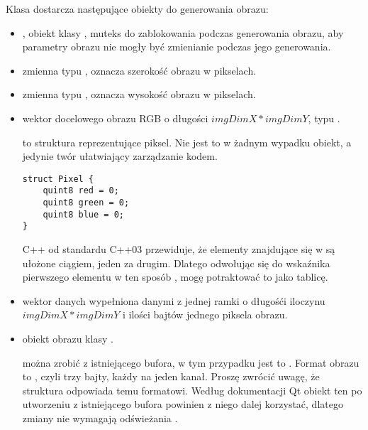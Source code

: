 \label{sec:algorithm-pixmap-generate}

Klasa  dostarcza następujące obiekty do generowania obrazu:
\begin{itemize}
    \item {}, obiekt klasy , muteks do zablokowania podczas generowania obrazu, aby parametry obrazu nie mogły być zmienianie podczas jego generowania.

    \item {} zmienna typu , oznacza szerokość obrazu w pikselach.

    \item {} zmienna typu , oznacza wysokość obrazu w pikselach.

    \item {} wektor docelowego obrazu RGB o długości $imgDimX*imgDimY$, typu .

           to struktura reprezentujące piksel.
          Nie jest to w żadnym wypadku obiekt, a jedynie twór ułatwiający zarządzanie kodem.

          \begin{lstlisting}
struct Pixel {
    quint8 red = 0;   
    quint8 green = 0;    
    quint8 blue = 0;   
}\end{lstlisting}

        \par
        C++ od standardu C++03 przewiduje, że elementy znajdujące się w  są ułożone ciągiem, jeden za drugim.
        Dlatego odwołując się do wskaźnika pierwszego elementu w ten sposób , mogę potraktować to jako tablicę.

    \item {} wektor danych wypełniona danymi z jednej ramki o długośći iloczynu $imgDimX*imgDimY$ i ilości bajtów jednego piksela obrazu.

    \item {} obiekt obrazu klasy .

           można zrobić z istniejącego bufora, w tym przypadku jest to .
          Format obrazu to , czyli trzy bajty, każdy na jeden kanał.
          Proszę zwrócić uwagę, że struktura  odpowiada temu formatowi.
          Według dokumentacji Qt obiekt ten po utworzeniu z istniejącego bufora powinien z niego dalej korzystać, dlatego zmiany  nie wymagają odświeżania .


\end{itemize}
